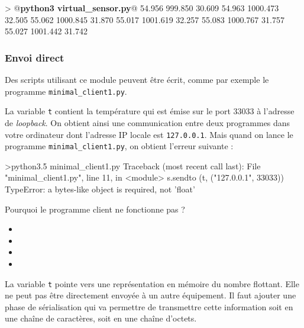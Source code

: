 \begin{termc}[backgroundcolor=\color{palerod}, language=json, basicstyle=\small, escapechar=@]
> @\textbf{python3 virtual\_sensor.py}@
 54.956    999.850  30.609
 54.963   1000.473  32.505
 55.062   1000.845  31.870
 55.017   1001.619  32.257
 55.083   1000.767  31.757
 55.027   1001.442  31.742
 \end{termc} 

\subsubsection{Envoi direct}

Des scripts utilisant ce module peuvent être écrit, comme par exemple le programme \texttt{minimal\_client1.py}.

La variable \texttt{t} contient la température qui est émise sur le port 33033 à l’adresse de \textit{loopback}. On obtient ainsi une communication entre deux programmes dans votre ordinateur dont l'adresse IP locale est \texttt{127.0.0.1}. Mais quand on lance le programme \texttt{minimal\_client1.py}, on obtient l’erreur suivante :

\begin{termc}[backgroundcolor=\color{palerod}, language=json, basicstyle=\small, escapechar=@]
 >python3.5 minimal_client1.py
Traceback (most recent call last):
  File "minimal_client1.py", line 11, in <module>
    s.sendto (t, ("127.0.0.1", 33033))
TypeError: a bytes-like object is required, not 'float'
\end{termc}

{Pourquoi le programme client ne fonctionne pas ?
\begin{itemize}[label=$\circ$]
   \item {}
   \item {}
   \item {}
   \item {}
 \end{itemize}
}
{La variable \texttt{t} pointe vers une représentation en mémoire du nombre flottant. Elle ne peut pas être directement envoyée à un autre équipement. Il faut ajouter une phase de sérialisation qui va permettre de transmettre cette information soit en une chaîne de caractères, soit en une chaîne d'octets.}

